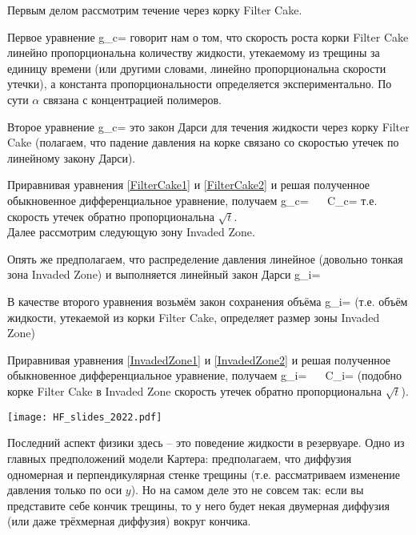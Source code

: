 \documentclass[main.tex]{subfiles}
\begin{document}
Первым делом рассмотрим течение через корку Filter Cake.

Первое уравнение
\beq\label{FilterCake1}
g_c=\alpha{}
\eeq
говорит нам о том, что скорость роста корки Filter Cake линейно пропорциональна количеству жидкости, утекаемому из трещины за единицу времени (или другими словами, линейно пропорциональна скорости утечки), а константа пропорциональности определяется экспериментально.
По сути $\alpha$ связана с концентрацией полимеров.

Второе уравнение 
\beq\label{FilterCake2}
g_c=
\eeq
это закон Дарси для течения жидкости через корку Filter Cake (полагаем, что падение давления на корке связано со скоростью утечек по линейному закону Дарси).

Приравнивая уравнения \eqref{FilterCake1} и \eqref{FilterCake2} и решая полученное обыкновенное дифференциальное уравнение, получаем
\beq
g_c=\,\,\,\,\,\,\,\,\,\,C_c=
\eeq
т.е. скорость утечек обратно пропорциональна $\sqrt{t}$.
\\

Далее рассмотрим следующую зону Invaded Zone.

Опять же предполагаем, что распределение давления линейное (довольно тонкая зона Invaded Zone) и выполняется линейный закон Дарси
\beq\label{InvadedZone1}
g_i=
\eeq

В качестве второго уравнения возьмём закон сохранения объёма
\beq\label{InvadedZone2}
g_i=\varphi{}
\eeq
(т.е. объём жидкости, утекаемой из корки Filter Cake, определяет размер зоны Invaded Zone)

Приравнивая уравнения \eqref{InvadedZone1} и \eqref{InvadedZone2} и решая полученное обыкновенное дифференциальное уравнение, получаем
\beq
g_i=\,\,\,\,\,\,\,\,\,\,C_i=
\eeq
(подобно корке Filter Cake в Invaded Zone скорость утечек обратно пропорциональна $\sqrt{t}$).

\texttt{[image: HF\_slides\_2022.pdf]}

Последний аспект физики здесь -- это поведение жидкости в резервуаре.
Одно из главных предположений модели Картера: предполагаем, что диффузия одномерная и перпендикулярная стенке трещины (т.е. рассматриваем изменение давления только по оси $y$).
Но на самом деле это не совсем так: если вы представите себе кончик трещины, то у него будет некая двумерная диффузия (или даже трёхмерная диффузия) вокруг кончика.
\end{document}
